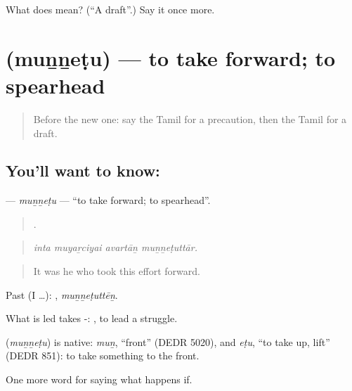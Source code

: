 \begin{tcolorbox}[breakable,colback=teal!4,colframe=teal!35!black,title={Before you move on}]
What does  mean? (\textquotedblleft{}A draft\textquotedblright{}.) Say it once more.
\end{tcolorbox}
\section[\texorpdfstring{\ta{முன்னெடு} (muṉṉeṭu)}{முன்னெடு (muṉṉeṭu)}]{ (muṉṉeṭu) — to take forward; to spearhead}

\label{lesson:TA-C386-munnetu}



\begin{quote}
Before the new one: say the Tamil for a precaution, then the Tamil for a draft.
\end{quote}

\subsection*{You'll want to know: }
\textbf{} — \emph{muṉṉeṭu} — \textquotedblleft{}to take forward; to spearhead\textquotedblright{}.

\begin{quote}
   .
\end{quote}

\begin{quote}
\emph{inta muyaṟciyai avartāṉ muṉṉeṭuttār.}
\end{quote}

\begin{quote}
It was he who took this effort forward.
\end{quote}

Past (I …): , \emph{muṉṉeṭuttēṉ}.

What is led takes -:  , to lead a struggle.

\begin{cousinweb}
\textbf{} (\emph{muṉṉeṭu}) is native: \emph{muṉ}, \textquotedblleft{}front\textquotedblright{} (DEDR 5020), and \emph{eṭu}, \textquotedblleft{}to take up, lift\textquotedblright{} (DEDR 851): to take something to the front.
\end{cousinweb}

\begin{grammarlens}[title={What you've built}]
One more word for saying what happens if.
\end{grammarlens}

